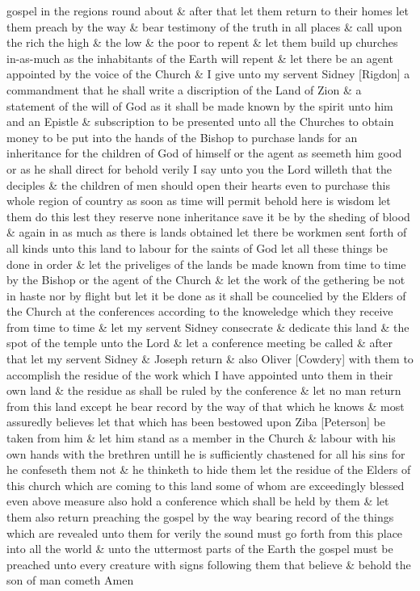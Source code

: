 gospel in the regions round about \& after that let them return to their homes let them preach by the way \& bear testimony of the truth in all places \& call upon the rich the high \& the low \& the poor to repent \& let them build up churches in-as-much as the inhabitants of the Earth will repent \& let there be an agent appointed by the voice of the Church \& I give unto my servent Sidney [Rigdon] a commandment that he shall write a discription of the Land of Zion \& a statement of the will of God as it shall be made known by the spirit unto him and an Epistle \& subscription to be presented unto all the Churches to obtain money to be put into the hands of the Bishop to purchase lands for an inheritance for the children of God of himself or the agent as seemeth him good or as he shall direct for behold verily I say unto you the Lord willeth that the deciples \& the children of men should open their hearts even to purchase this whole region of country as soon as time will permit behold here is wisdom let them do this lest they reserve none inheritance save it be by the sheding of blood \& again in as much as there is lands obtained let there be workmen sent forth of all kinds unto this land to labour for the saints of God let all these things be done in order \& let the priveliges of the lands be made known from time to time by the Bishop or the agent of the Church \& let the work of the gethering be not in haste nor by flight but let it be done as it shall be councelied by the Elders of the Church at the conferences according to the knoweledge which they receive from time to time \& let my servent Sidney consecrate \& dedicate this land \& the spot of the temple unto the Lord \& let a conference meeting be called \& after that let my servent Sidney \& Joseph return \& also Oliver [Cowdery] with them to accomplish the residue of the work which I have appointed unto them in their own land \& the residue as shall be ruled by the conference \& let no man return from this land except he bear record by the way of that which he knows \& most assuredly believes let that which has been bestowed upon Ziba [Peterson] be taken from him \& let him stand as a member in the Church \& labour with his own hands with the brethren untill he is sufficiently chastened for all his sins for he confeseth them not \& he thinketh to hide them let the residue of the Elders of this church which are coming to this land some of whom are exceedingly blessed even above measure also hold a conference which shall be held by them \& let them also return preaching the gospel by the way bearing record of the things which are revealed unto them for verily the sound must go forth from this place into all the world \& unto the uttermost parts of the Earth the gospel must be preached unto every creature with signs following them that believe \& behold the son of man cometh Amen
				
